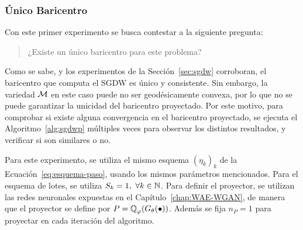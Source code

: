 \subsubsection{Único Baricentro}\label{sssec:sgdwp-unico-bar}  %


Con este primer experimento se busca contestar a la siguiente pregunta: 
\begin{quotation}
    \centering
    ¿Existe un único baricentro para este problema?
\end{quotation}
Como se sabe, y los experimentos de la Sección~\ref{sec:sgdw} corroboran, el baricentro que computa el SGDW es único y consistente. Sin embargo, la variedad $\operatorname{\mathcal{M}}$ en este caso puede no ser geodésicamente convexa, por lo que no se puede garantizar la unicidad del baricentro proyectado. Por este motivo, para comprobar si existe alguna convergencia en el baricentro proyectado, se ejecuta el Algoritmo~\ref{alg:sgdwp} múltiples veces para observar los distintos resultados, y verificar si son similares o no.

Para este experimento, se utiliza el mismo esquema $(\eta_k)_k$ de la Ecuación~\ref{eq:esquema-paso}, usando los mismos parámetros mencionados. Para el esquema de lotes, se utiliza $S_k=1,\ \forall k \in \mathbb{N}$. Para definir el proyector, se utilizan las redes neuronales expuestas en el Capítulo~\ref{chap:WAE-WGAN}, de manera que el proyector se define por $P = \ProbQ_\varphi (G_\theta (\bullet))$. Además se fija $n_P=1$ para proyectar en cada iteración del algoritmo.

